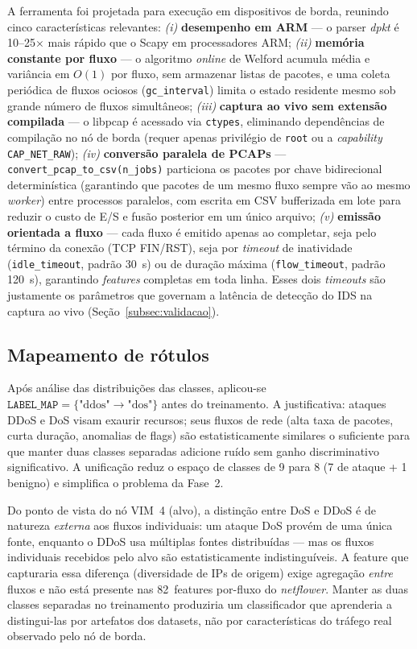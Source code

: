 \documentclass[12pt]{article}
\begin{document}
A ferramenta foi projetada para execução em dispositivos de borda, reunindo cinco
características relevantes: \textit{(i)} \textbf{desempenho em ARM} — o parser
\textit{dpkt} é 10--25$\times$ mais rápido que o Scapy em processadores ARM;
\textit{(ii)} \textbf{memória constante por fluxo} — o algoritmo \textit{online}
de Welford acumula média e variância em $O(1)$ por fluxo, sem armazenar listas de
pacotes, e uma coleta periódica de fluxos ociosos (\texttt{gc\_interval}) limita o
estado residente mesmo sob grande número de fluxos simultâneos; \textit{(iii)}
\textbf{captura ao vivo sem extensão compilada} — o libpcap é acessado via
\texttt{ctypes}, eliminando dependências de compilação no nó de borda (requer
apenas privilégio de \texttt{root} ou a \textit{capability} \texttt{CAP\_NET\_RAW});
\textit{(iv)} \textbf{conversão paralela de PCAPs} —
\texttt{convert\_pcap\_to\_csv(n\_jobs)} particiona os pacotes por chave
bidirecional determinística (garantindo que pacotes de um mesmo fluxo sempre vão
ao mesmo \textit{worker}) entre processos paralelos, com escrita em CSV
bufferizada em lote para reduzir o custo de E/S e fusão posterior em um único
arquivo; \textit{(v)} \textbf{emissão orientada a fluxo} — cada fluxo é emitido
apenas ao completar, seja pelo término da conexão (TCP FIN/RST), seja por
\textit{timeout} de inatividade (\texttt{idle\_timeout}, padrão 30~s) ou de
duração máxima (\texttt{flow\_timeout}, padrão 120~s), garantindo \textit{features}
completas em toda linha. Esses dois \textit{timeouts} são justamente os parâmetros
que governam a latência de detecção do IDS na captura ao vivo
(Seção~\ref{subsec:validacao}).

\subsection{Mapeamento de rótulos}

Após análise das distribuições das classes, aplicou-se
$\texttt{LABEL\_MAP} = \{\text{"ddos"} \rightarrow \text{"dos"}\}$ antes do
treinamento. A justificativa: ataques DDoS e DoS visam exaurir recursos; seus
fluxos de rede (alta taxa de pacotes, curta duração, anomalias de flags)
são estatisticamente similares o suficiente para que manter duas classes
separadas adicione ruído sem ganho discriminativo significativo. A unificação
reduz o espaço de classes de 9 para 8 (7 de ataque + 1 benigno) e simplifica
o problema da Fase~2.

Do ponto de vista do nó VIM~4 (alvo), a distinção entre DoS e DDoS é de natureza
\textit{externa} aos fluxos individuais: um ataque DoS provém de uma única fonte,
enquanto o DDoS usa múltiplas fontes distribuídas — mas os fluxos individuais
recebidos pelo alvo são estatisticamente indistinguíveis. A feature que capturaria
essa diferença (diversidade de IPs de origem) exige agregação \textit{entre} fluxos
e não está presente nas 82~features por-fluxo do \textit{netflower}. Manter as
duas classes separadas no treinamento produziria um classificador que aprenderia a
distingui-las por artefatos dos datasets, não por características do tráfego real
observado pelo nó de borda.
\end{document}

